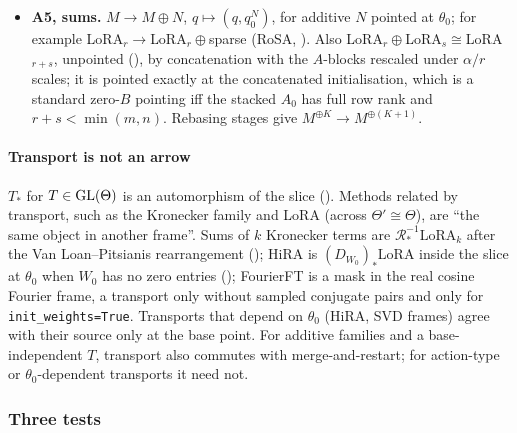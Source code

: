 \begin{itemize}
  objects; HRA${}\to{}$OFT$_{\SO}$ and HRA${}\to{}$LoRA$_r$, at the level of images only. An intersection of images
  gives only inclusions of images, not arrows of $\Meth$; for example $\Im{}$LoRA$_r\cap\Im{}$(IA)$^3$ exists only as a
  set, and there is no product in $\Diff$.
  \item \textbf{A5, sums.} $M\to M\oplus N$, $q\mapsto(q,q_0^N)$, for additive $N$ pointed at $\theta_0$; for example
  LoRA$_r\to{}$LoRA$_r\oplus{}$sparse (RoSA, \citealp{nikdan2024rosa}). Also
  LoRA$_r\oplus{}$LoRA$_s\cong{}$LoRA$_{r+s}$, unpointed (), by concatenation with the
  $A$-blocks rescaled under $\alpha/r$ scales; it is pointed exactly at the concatenated initialisation, which is a
  standard zero-$B$ pointing iff the stacked $A_0$ has full row rank and $r+s<\min(m,n)$. Rebasing stages give
  $M^{\oplus K}\to M^{\oplus(K+1)}$.
\end{itemize}

\paragraph{Transport is not an arrow}
$T_*$ for $T\in\mathrm{GL}(\Theta)$ is an automorphism of the slice (). Methods related by
transport, such as the Kronecker family and LoRA (across $\Theta'\cong\Theta$), are ``the same object in another
frame''. Sums of $k$ Kronecker terms are $\mathcal R^{-1}_*{}$LoRA$_k$ after the Van Loan--Pitsianis rearrangement
(); HiRA is $(D_{W_0})_*{}$LoRA inside the slice at $\theta_0$ when $W_0$ has no zero entries
(); FourierFT is a mask in the real cosine Fourier frame, a transport only without sampled
conjugate pairs and only for \texttt{init\_weights=True}. Transports that depend on $\theta_0$ (HiRA, SVD frames) agree
with their source only at the base point. For additive families and a base-independent $T$, transport also commutes
with merge-and-restart; for action-type or $\theta_0$-dependent transports it need not.

\subsubsection{Three tests}\label{sec:atlas-tests}

